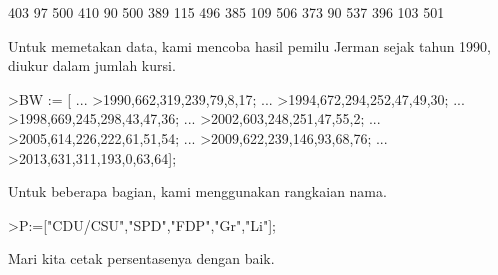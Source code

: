 \documentclass[a4paper,10pt]{article}
\begin{document}
\begin{eulernotebook}
\begin{eulercomment}
\begin{eulercomment}
\begin{euleroutput}
            403            97           500 
            410            90           500 
            389           115           496 
            385           109           506 
            373            90           537 
            396           103           501 
\end{euleroutput}
\begin{eulercomment}
Untuk memetakan data, kami mencoba hasil pemilu Jerman sejak tahun
1990, diukur dalam jumlah kursi.
\end{eulercomment}
\begin{eulerprompt}
>BW := [ ...
>1990,662,319,239,79,8,17; ...
>1994,672,294,252,47,49,30; ...
>1998,669,245,298,43,47,36; ...
>2002,603,248,251,47,55,2; ...
>2005,614,226,222,61,51,54; ...
>2009,622,239,146,93,68,76; ...
>2013,631,311,193,0,63,64];
\end{eulerprompt}
\begin{eulercomment}
Untuk beberapa bagian, kami menggunakan rangkaian nama.
\end{eulercomment}
\begin{eulerprompt}
>P:=["CDU/CSU","SPD","FDP","Gr","Li"];
\end{eulerprompt}
\begin{eulercomment}
Mari kita cetak persentasenya dengan baik.


\end{eulercomment}
\end{eulercomment}
\end{eulercomment}
\end{eulernotebook}
\end{document}
